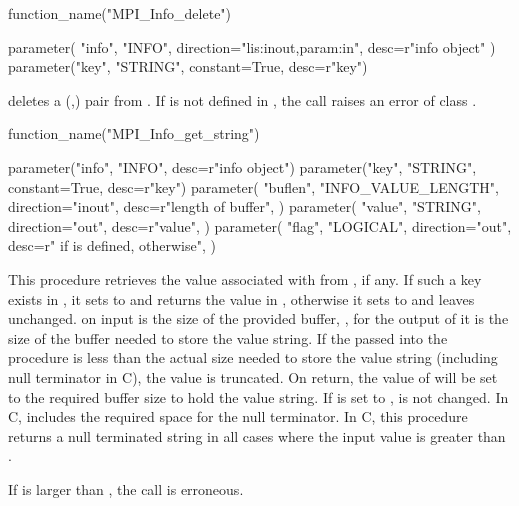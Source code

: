 %
\begin{mpi-binding}
    function_name("MPI_Info_delete")
    
    parameter(
        "info", "INFO", direction="lis:inout,param:in", desc=r"info object"
    )
    parameter("key", "STRING", constant=True, desc=r"key")
\end{mpi-binding}

 deletes a (,) pair from .
If  is not defined in , the call
raises an error of class .

%
\begin{mpi-binding}
    function_name("MPI_Info_get_string")
    
    parameter("info", "INFO", desc=r"info object")
    parameter("key", "STRING", constant=True, desc=r"key")
    parameter(
        "buflen",
        "INFO_VALUE_LENGTH",
        direction="inout",
        desc=r"length of buffer",
    )
    parameter(
        "value",
        "STRING",
        direction="out",
        desc=r"value",
    )
    parameter(
        "flag",
        "LOGICAL",
        direction="out",
        desc=r" if  is defined,  otherwise",
    )
\end{mpi-binding}



This procedure retrieves the value associated with  from , if any.
If such a key exists in , it sets  to 
and returns the value in ,
otherwise it sets  to  and leaves
 unchanged. 
 on input is the size of the provided buffer, , for the output of  it is the size of the buffer needed to store the
value string. If the  passed into the procedure is less than the
actual size needed to store the value string (including null terminator in C), the value is
truncated. On return, the value of  will be set to the required
buffer size to hold the value string. If  is set to ,  is not changed. 
In C,  
includes the required space for the null terminator. In C,
this procedure returns a null terminated string in all cases where
the  input value is greater than .

If  is larger than , 
the call is erroneous. 

